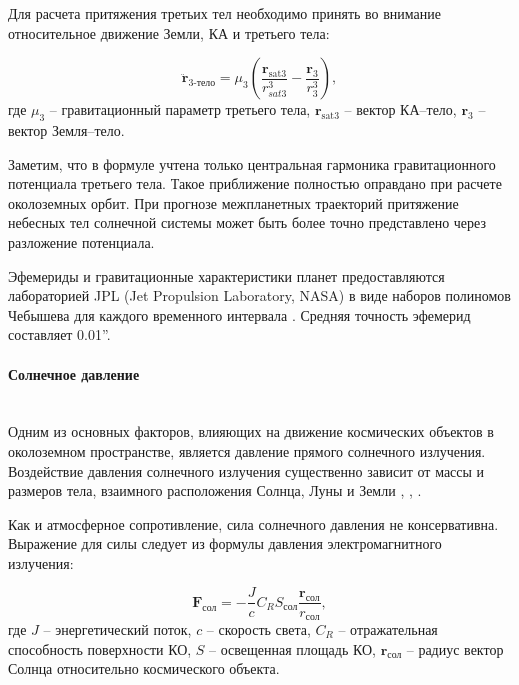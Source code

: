 Для расчета притяжения третьих тел необходимо принять во внимание относительное движение
Земли, КА и третьего тела:

\begin{equation*}
    \ddot{\mathbf{r}}_{\text{3-тело}} = \mu_3 \left( \frac{\mathbf{r}_{\text{sat3}}}{r^3_{sat3}}
                                    - \frac{\mathbf{r}_{\text{3}}}{r^3_{3}} \right),
\end{equation*}
где $\mu_3$ -- гравитационный параметр третьего тела,
 $\mathbf{r}_{\text{sat3}}$ -- вектор КА--тело, 
 $\mathbf{r}_{3}$ -- вектор Земля--тело. 

Заметим, что в формуле учтена только центральная гармоника гравитационного потенциала третьего тела.
Такое приближение полностью оправдано при расчете околоземных орбит.
При прогнозе межпланетных траекторий притяжение небесных тел солнечной системы может быть 
более точно представлено через разложение потенциала.

Эфемериды и гравитационные характеристики планет предоставляются лабораторией JPL 
(Jet Propulsion Laboratory, NASA) в виде наборов полиномов Чебышева для
каждого временного интервала \cite{standish1998}. Средняя точность эфемерид составляет 0.01''.

\paragraph{Солнечное давление} \mbox{} \\

Одним из основных факторов, влияющих на движение космических объектов в околоземном пространстве, является давление прямого солнечного излучения. Воздействие
давления солнечного излучения существенно зависит от массы и размеров тела, взаимного
расположения Солнца, Луны и Земли \cite{Musen1960}, \cite{Parkinson1960}, \cite{Vallado2013-ee}.

Как и атмосферное сопротивление, сила солнечного давления не консервативна. Выражение для силы следует из формулы давления
электромагнитного излучения:

\begin{equation*}
    \mathbf{F}_{\text{сол}} = -\frac{J}{c} C_R S_{\text{сол}} \frac{\mathbf{r}_{\text{сол}}}{r_{\text{сол}}},
\end{equation*}
где $J$ -- энергетический поток, $c$ -- скорость света,
$C_R$ -- отражательная способность поверхности КО,
$S$ -- освещенная площадь КО,
$\mathbf{r}_{\text{сол}}$ -- радиус вектор Солнца относительно космического объекта.

